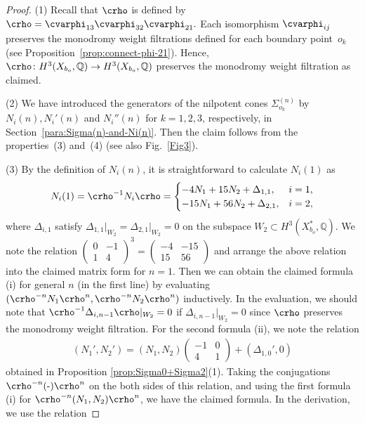 \documentclass[pdftex]{sigma}
\numberwithin{equation}{section}
\begin{document}
\begin{proof} (1) Recall that $\crho$ is defined by $\crho=\cvarphi_{13}\cvarphi_{32}\cvarphi_{21}.$ Each isomorphism $\cvarphi_{ij}$ preserves the monodromy weight filtrations defined for each boundary point~$o_{k}$ (see Proposition~\ref{prop:connect-phi-21}). Hence, $\crho\colon H^{3}(X_{b_{o}},\mathbb{Q})\to H^{3}(X_{b_{o}},\mathbb{Q})$ preserves the monodromy weight filtration as claimed.

(2) We have introduced the generators of the nilpotent cones $\Sigma_{o_{k}}^{(n)}$ by $N_{i}(n),N_{i}'(n)$ and $N_{i}''(n)$ for $k=1,2,3$, respectively, in Section~\ref{para:Sigma(n)-and-Ni(n)}. Then the claim follows from the properties~(3) and~(4) (see also Fig.~\ref{Fig3}).

(3) By the definition of $N_{i}(n)$, it is straightforward to calculate $N_{i}(1)$ as
\begin{gather*}
N_{i}(1)=\crho^{-1}N_{i}\crho=\begin{cases}
-4N_{1}+15N_{2}+\Delta_{1,1}, & i=1,\\
-15N_{1}+56N_{2}+\Delta_{2,1}, & i=2,
\end{cases}
\end{gather*}
where $\Delta_{i,1}$ satisfy $\Delta_{1,1}\vert_{W_{2}}=\Delta_{2,1}\vert_{W_{2}}=0$ on the subspace $W_{2}\subset H^{3}(X_{b_{o}}^{*},\mathbb{Q})$. We note the relation $\left(\begin{smallmatrix}0 & -1\\
1 & 4 \end{smallmatrix}\right)^{3}=\left(\begin{smallmatrix}-4 & -15\\
15 & 56 \end{smallmatrix}\right)$ and arrange the above relation into the claimed matrix form for $n=1$. Then we can obtain the claimed formula (i) for general $n$ (in the first line) by evaluating $(\crho^{-n}N_{1}\crho^{n},\crho^{-n}N_{2}\crho^{n})$ inductively. In the evaluation, we should note that $\crho^{-1}\Delta_{i,n-1}\crho\vert_{W_{2}}=0$ if $\Delta_{i,n-1}\vert_{W_{2}}=0$ since $\crho$ preserves the monodromy weight filtration. For the second formula (ii), we note the relation
\begin{gather*}
(N_{1}',N_{2}')=(N_{1},N_{2})\left(\begin{matrix}-1 & 0\\
4 & 1
\end{matrix}\right)+(\Delta_{1,0}',0)
\end{gather*}
obtained in Proposition \ref{prop:Sigma0+Sigma2}(1). Taking the conjugations $\crho^{-n}(\text{-})\crho^{n}$ on the both sides of this relation, and using the first formula (i) for $\crho^{-n}(N_{1},N_{2})\crho^{n}$, we have the claimed formula. In the derivation, we use the relation

\end{proof}
\end{document}
